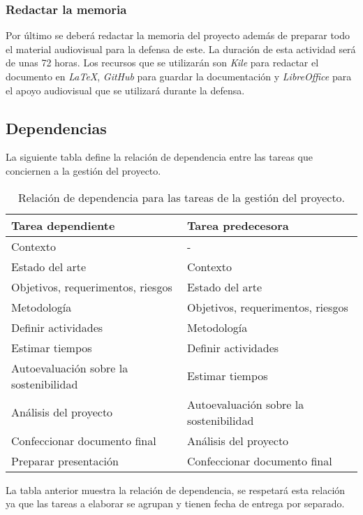 \subsubsection{Redactar la memoria}

Por último se deberá redactar la memoria del proyecto además de preparar todo el material audiovisual para la defensa de este. La duración de esta actividad será de unas 72 horas. Los recursos que se utilizarán son \textit{Kile} para redactar el documento en \textit{LaTeX}, \textit{GitHub} para guardar la documentación y \textit{LibreOffice} para el apoyo audiovisual que se utilizará durante la defensa.

\subsection{Dependencias}

La siguiente tabla define la relación de dependencia entre las tareas que conciernen a la gestión del proyecto.

\begin{table}[H]
\centering
 \begin{tabular}{|| l | l ||}
    \hline  
    Tarea dependiente & Tarea predecesora \\
    \hline\hline
    Contexto & - \\
    \hline
    Estado del arte & Contexto \\
    \hline
    Objetivos, requerimentos, riesgos & Estado del arte \\
    \hline
    Metodología & Objetivos, requerimentos, riesgos \\
    \hline
    Definir actividades & Metodología \\
    \hline
    Estimar tiempos & Definir actividades \\
    \hline
    Autoevaluación sobre la sostenibilidad & Estimar tiempos \\
    \hline
    Análisis del proyecto & Autoevaluación sobre la sostenibilidad \\
    \hline
    Confeccionar documento final & Análisis del proyecto \\
    \hline
    Preparar presentación & Confeccionar documento final \\
    \hline
 \end{tabular}
 \caption{Relación de dependencia para las tareas de la gestión del proyecto.}
 \label{table:1}
\end{table}

La tabla anterior muestra la relación de dependencia, se respetará esta relación ya que las tareas a elaborar se agrupan y tienen fecha de entrega por separado. 

